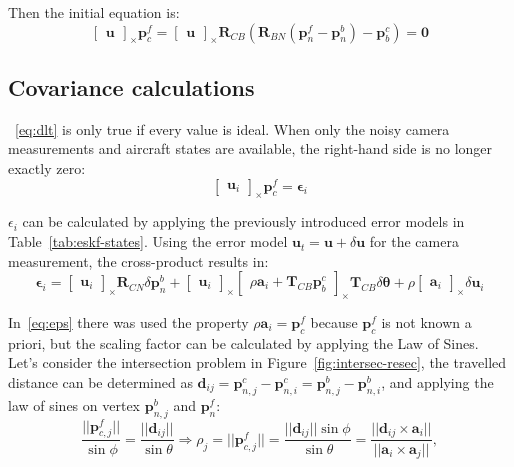 Then the initial equation is:
\begin{equation}
    \begin{bmatrix}
        \mathbf{u}
    \end{bmatrix}_\times\mathbf{p}_c^f=\begin{bmatrix}
        \mathbf{u}
    \end{bmatrix}_\times\mathbf{R}_{CB}(\mathbf{R}_{BN}(\mathbf{p}_n^f-\mathbf{p}_n^b)-\mathbf{p}_b^c)=\mathbf{0}
\end{equation}\label{eq:dlt}

\subsection{Covariance calculations}

~\eqref{eq:dlt} is only true if every value is ideal. When only the noisy camera measurements and aircraft states are available, the right-hand side is no longer exactly zero:
\begin{equation}
    \begin{bmatrix}
        \mathbf{u}_i
    \end{bmatrix}_\times\mathbf{p}_c^f=\boldsymbol{\epsilon}_i
\end{equation}

$\epsilon_i$ can be calculated by applying the previously introduced error models in Table~\ref{tab:eskf-states}. Using the error model $\mathbf{u}_t=\mathbf{u}+\delta\mathbf{u}$ for the camera measurement, the cross-product results in:
\begin{equation}
    \boldsymbol{\epsilon}_i=\begin{bmatrix}
        \mathbf{u}_i
    \end{bmatrix}_\times\mathbf{R}_{CN}\delta\mathbf{p}_n^b +
    \begin{bmatrix}
        \mathbf{u}_i
    \end{bmatrix}_\times
    \begin{bmatrix}
    \rho\mathbf{a}_i+\mathbf{T}_{CB}\mathbf{p}_b^c
    \end{bmatrix}_\times\mathbf{T}_{CB}\delta\boldsymbol{\theta}+\rho\begin{bmatrix}
        \mathbf{a}_i
    \end{bmatrix}_\times\delta\mathbf{u}_i
    \label{eq:eps}
\end{equation}


In~\eqref{eq:eps} there was used the property $\rho\mathbf{a}_i = \mathbf{p}_c^f$ because $\mathbf{p}_c^f$ is not known a priori, but the scaling factor can be calculated by applying the Law of Sines. Let's consider the intersection problem in Figure~\ref{fig:intersec-resec}, the travelled distance can be determined as $\mathbf{d}_{ij}=\mathbf{p}_{n,j}^c-\mathbf{p}_{n, i}^c = \mathbf{p}_{n,j}^b-\mathbf{p}_{n, i}^b$, and applying the law of sines on vertex $\mathbf{p}_{n,j}^b$ and $\mathbf{p}_n^f$:
\begin{equation}
    \frac{||\mathbf{p}_{c,j}^f||}{\sin\phi}=\frac{||\mathbf{d}_{ij}||}{\sin\theta}\Rightarrow \rho_j=||\mathbf{p}_{c,j}^f||=\frac{||\mathbf{d}_{ij}||\sin\phi}{\sin\theta} =
    \frac{||\mathbf{d}_{ij}\times\mathbf{a}_i||}{||\mathbf{a}_i\times\mathbf{a}_j||},
\end{equation}

